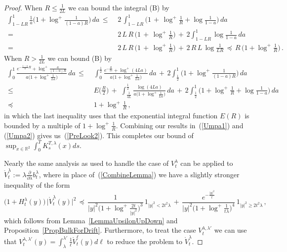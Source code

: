 \documentclass[10pt]{article}
\numberwithin{equation}{section}
\theoremstyle{definition}
\newcommand{\R}{{\mathbb R}}
\begin{document}
\begin{proof}
When $R\leq  \frac{1 }{2L}$ we can bound the integral (B)  by
\begin{align} \label{Umpa1}
\int^{1  }_{1-L R }\frac{1}{a}\bigg( 1+\log^{+}\frac{1}{(1-a)R}  \bigg)\, da  \nonumber \,\leq\, & \,2\,\int^{1  }_{1-L R }\bigg( 1\,+\,\log^{+}\frac{1}{R} +\log\frac{1}{1-a}   \bigg)\, da  \nonumber 
\\ \,= \,&\,  2\,L\,R \,\Big(1\,+\,\log^{+}\frac{1}{R} \Big)\,+\,   2\int^{1  }_{1-L R  }\log\frac{1}{1-a}  \,  da  \nonumber
\\ \,= \,&\,  2\,L\,R\, \Big(1\,+\,\log^{+}\frac{1}{R} \Big)\,+\,   2\,R\, L\,\log\frac{1}{LR}   \, \preceq \, R\,\Big(1+\log^+\frac{1}{R}\Big)  \,.
\end{align}
  When $R >  \frac{1}{2L}$ we can bound (B) by
\begin{align}\label{Umpa2}
 \int^{1  }_{0}\frac{ e^{-\frac{1-a}{a}R}+\log^{+}\frac{a}{(1-a)R}  }{a\big( 1+ \log^+ \frac{1}{L a} \big)}\, da \nonumber     \,\leq \,&\, \int^{\frac{1}{2}  }_{0}\frac{ e^{-\frac{R}{2a}}+\log^{+}(4La)  }{a\big( 1+ \log^+ \frac{1}{L a} \big)}\, da\, +\,2\int^{1  }_{\frac{1}{2} } \bigg( 1+\log^{+}\frac{1}{(1-a)R}  \bigg)\, da\nonumber  \\   \,\leq \, &\,E\Big( \frac{R}{2} \Big) \,+\, \,\int^{\frac{1}{2}  }_{\frac{1}{4L}  }\frac{\log(4La)   }{a\big( 1+ \log^+ \frac{1}{L  a} \big)}\, da\, +\,2\int^{1  }_{\frac{1}{2} } \bigg( 1+\log^{+}\frac{1}{R} +\log\frac{1}{1-a} \bigg)\, da\nonumber  \\
 \,\preceq \,&\, 1+\log^+\frac{1}{R}\,,
\end{align}
in which the last inequality uses  that the exponential integral function $E(R)$ is bounded by a multiple of $1+ \log^+ \frac{1}{R}$.  Combining our results in~(\ref{Umpa1}) and (\ref{Umpa2}) gives us~(\ref{PreLook2}).  This completes our bound of $ \sup_{x\in \R^2} \int_0^T K_s^{T,\lambda}(x)ds  $. \vspace{.1cm}

  Nearly the same analysis as used to handle the case of $V_{t}^{ \lambda }$ can be  applied to $\mathring{V}_{t}^{ \lambda }:=\lambda \frac{ \partial }{\partial \lambda }b_t^{\lambda}$, where in place of~(\ref{CombineLemma})   we have a slightly stronger inequality of the form 
$$  \big(1+ H_{t}^{\lambda}(y) \big)\,\big| \mathring{V}_{t}^{ \lambda }(y)\big|^2 \,\preceq \, \frac{1 }{|y|^2\big(1+\log^+ \frac{2t}{|y|^2}  \big)^3}\,1_{|y|^2 <  2t^2\lambda    }   \,+\,  \frac{e^{-\frac{|y|^2}{t}}    }{|y|^2\big(1+\log^+\frac{1}{t\lambda}\big)^4    }\,1_{|y|^2 \geq  2t^2 \lambda  } \,,    $$
which follows from Lemma~\ref{LemmaUpsilonUpDown} and Proposition~\ref{PropBulkForDrift}.  Furthermore, to treat the case $ V_t^{\lambda,\lambda'}$ we can use that $ V_t^{\lambda,\lambda'}(y)=\int_{\lambda}^{\lambda'} \frac{1}{\ell} \mathring{V}_{t}^{\ell }(y)d\ell$ to reduce the problem to $\mathring{V}_{t}^{\lambda }$.
\end{proof}
\end{document}
